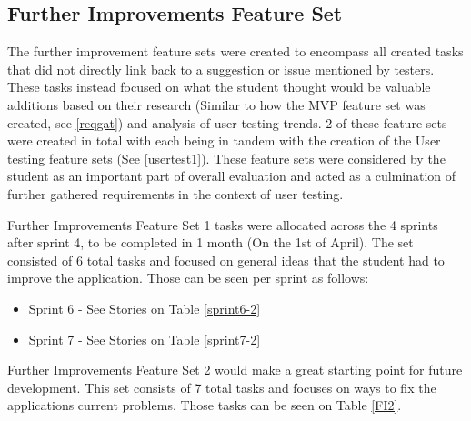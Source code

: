 \subsection{Further Improvements Feature Set} \label{furtherimprov}
The further improvement feature sets were created to encompass all created tasks that did not directly link back to a suggestion or issue mentioned by testers. These tasks instead focused on what the student thought would be valuable additions based on their research (Similar to how the MVP feature set was created, see \ref{reqgat}) and analysis of user testing trends. 2 of these feature sets were created in total with each being in tandem with the creation of the User testing feature sets (See \ref{usertest1}). These feature sets were considered by the student as an important part of overall evaluation and acted as a culmination of further gathered requirements in the context of user testing.

Further Improvements Feature Set 1 tasks were allocated across the 4 sprints after sprint 4, to be completed in 1 month (On the 1st of April). The set consisted of 6 total tasks and focused on general ideas that the student had to improve the application. Those can be seen per sprint as follows:

\begin{itemize}
    \item Sprint 6 - See Stories on Table \ref{sprint6-2}
    \item Sprint 7 - See Stories on Table \ref{sprint7-2}
\end{itemize}

Further Improvements Feature Set 2 would make a great starting point for future development. This set consists of 7 total tasks and focuses on ways to fix the applications current problems. Those tasks can be seen on Table \ref{FI2}.